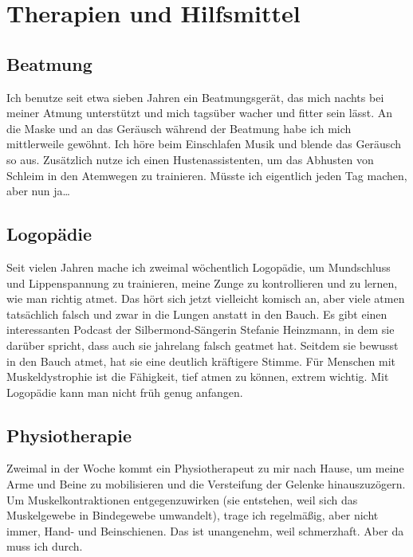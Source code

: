 \documentclass[fontsize=14pt,a4paper,headinclude,DIV=calc,automark]{scrbook}
\begin{document}
\section{Therapien und Hilfsmittel}
\label{sec:therapien_und_hilfsmittel}
\vspace{0.5\baselineskip}
\subsection{Beatmung}

Ich benutze seit etwa sieben Jahren ein Beatmungsgerät, das mich nachts bei meiner Atmung unterstützt und mich tagsüber wacher und fitter sein lässt. An die Maske und an das Geräusch während der Beatmung habe ich mich mittlerweile gewöhnt. Ich höre beim Einschlafen Musik und blende das Geräusch so aus. Zusätzlich nutze ich einen Hustenassistenten, um das Abhusten von Schleim in den Atemwegen zu trainieren. Müsste ich eigentlich jeden Tag machen, aber nun ja…

\subsection{Logopädie}

Seit vielen Jahren mache ich zweimal wöchentlich Logopädie, um Mundschluss und Lippenspannung zu trainieren, meine Zunge zu kontrollieren und zu lernen, wie man richtig atmet. Das hört sich jetzt vielleicht komisch an, aber viele atmen tatsächlich falsch und zwar in die Lungen anstatt in den Bauch. Es gibt einen interessanten Podcast der Silbermond-Sängerin Stefanie Heinzmann, in dem sie darüber spricht, dass auch sie jahrelang falsch geatmet hat. Seitdem sie bewusst in den Bauch atmet, hat sie eine deutlich kräftigere Stimme. Für Menschen mit Muskeldystrophie ist die Fähigkeit, tief atmen zu können, extrem wichtig. Mit Logopädie kann man nicht früh genug anfangen.

\subsection{Physiotherapie}

Zweimal in der Woche kommt ein Physiotherapeut zu mir nach Hause, um meine Arme und Beine zu mobilisieren und die Versteifung der Gelenke hinauszuzögern. Um Muskelkontraktionen entgegenzuwirken (sie entstehen, weil sich das Muskelgewebe in Bindegewebe umwandelt), trage ich regelmäßig, aber nicht immer, Hand- und Beinschienen. Das ist unangenehm, weil schmerzhaft. Aber da muss ich durch.
\end{document}
